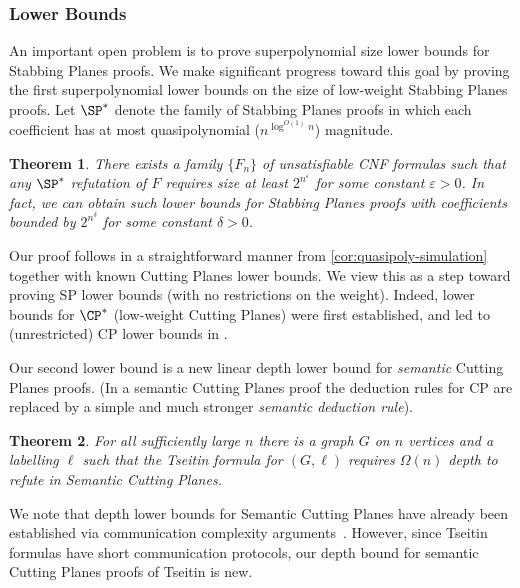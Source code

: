 \documentclass[11pt]{article}
\numberwithin{equation}{section}
\newtheorem{theorem}{Theorem}[section]
\theoremstyle{definition}
\theoremstyle{plain}
\newcounter{cor}\renewcommand{\thecor}{1.1.\arabic{cor}}\newenvironment{cor}{\ifnum\value{cor}=0\refstepcounter{cor}\else\PackageError{toc-native-compat}{Unsupported additional cor envelope}{Only the one exact source-observed cor paragraph is allowed.}\fi}{}\providecommand{\corautorefname}{Theorem}
\begin{document}
\subsubsection{Lower Bounds} 
An important open problem is to prove superpolynomial size lower bounds for Stabbing Planes proofs.
We make significant progress toward this goal by proving the first superpolynomial lower bounds
on the size of low-weight Stabbing Planes proofs.
Let $\SP^*$ denote the family of Stabbing Planes proofs in which each coefficient has at most quasipolynomial ($n^{\log^{O(1)} n}$) magnitude.
%

\begin{theorem}\label{thm:spstar-lb}
There exists a family %
%
$\{F_n\}$ of unsatisfiable CNF formulas  %
such that any $\SP^*$ refutation of $F$ requires size at least $2^{n^\varepsilon}$ for
some %
constant $\varepsilon > 0$. In fact, we can obtain such lower bounds for Stabbing Planes proofs with coefficients bounded by $2^{n^\delta}$ for some constant $\delta>0$.
\end{theorem}

Our proof follows in a straightforward manner from \autoref{cor:quasipoly-simulation} together with known Cutting Planes lower bounds.
We view this as a step toward proving SP lower bounds (with no restrictions on the weight).
Indeed, lower bounds for $\CP^*$ (low-weight Cutting Planes) \cite{BonetPR97} were first established, and led to (unrestricted) CP lower bounds
in %
\cite{Pudlak97}. 


Our second lower bound is a new linear depth lower bound for \emph{semantic}
Cutting Planes proofs.
(In a semantic Cutting Planes proof the deduction rules for CP are replaced by
a simple and much stronger \emph{semantic deduction rule}).
%
%

\begin{theorem}
\label{depth-lb}
   For all sufficiently large $n$ there is a graph $G$ on $n$ vertices and a labelling $\ell$ such that the Tseitin formula for $(G, \ell)$ requires $\Omega(n)$ depth to refute in Semantic Cutting Planes.
\end{theorem}


%
We note that depth lower bounds for Semantic Cutting Planes have already
been  %
established  %
%
via communication complexity arguments~\cite{ipu:cp}.  %
However, since Tseitin formulas have short communication protocols,
our depth bound for semantic Cutting Planes proofs of Tseitin is new.
%
%
\end{document}
